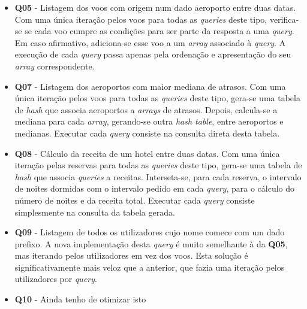\documentclass[11pt, a4paper]{article}
\begin{document}
\begin{itemize}
    \item \textbf{Q05} - Listagem dos voos com origem num dado aeroporto entre duas datas. Com uma
                         única iteração pelos voos para todas as \emph{queries} deste tipo,
                         verifica-se se cada voo cumpre as condições para ser parte da resposta
                         a uma \emph{query}. Em caso afirmativo, adiciona-se esse voo a um
                         \emph{array} associado à \emph{query}. A execução de cada \emph{query}
                         passa apenas pela ordenação e apresentação do seu \emph{array}
                         correspondente.

    \item \textbf{Q07} - Listagem dos aeroportos com maior mediana de atrasos. Com uma única
                         iteração pelos voos para todas as \emph{queries} deste tipo, gera-se uma
                         tabela de \emph{hash} que associa aeroportos a \emph{arrays} de atrasos.
                         Depois, calcula-se a mediana para cada \emph{array}, gerando-se outra
                         \emph{hash table}, entre aeroportos e medianas. Executar cada \emph{query}
                         consiste na consulta direta desta tabela.

    \item \textbf{Q08} - Cálculo da receita de um hotel entre duas datas. Com uma única iteração
                         pelas reservas para todas as \emph{queries} deste tipo, gera-se uma tabela
                         de \emph{hash} que associa \emph{queries} a receitas. Interseta-se, para
                         cada reserva, o intervalo de noites dormidas com o intervalo pedido em cada
                         \emph{query}, para o cálculo do número de noites e da receita total.
                         Executar cada \emph{query} consiste simplesmente na consulta da tabela
                         gerada.

    \item \textbf{Q09} - Listagem de todos os utilizadores cujo nome comece com um dado prefixo. A
                         nova implementação desta \emph{query} é muito semelhante à da \textbf{Q05},
                         mas iterando pelos utilizadores em vez dos voos. Esta solução é
                         significativamente mais veloz que a anterior, que fazia uma iteração pelos
                         utilizadores por \emph{query}.

    \item \textbf{Q10} - {\color{red}Ainda tenho de otimizar isto}
\end{itemize}
\end{document}
